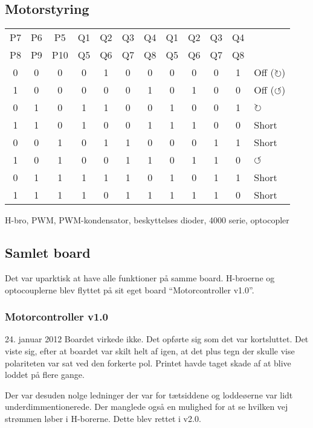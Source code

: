 \documentclass[a4paper,oneside,article,danish,table,draft]{memoir}
\newcommand{\boarddate}[1]{\textcolor{blue!80!black}{#1}}
\begin{document}
\subsection{Motorstyring}
\begin{table}[htbp]
  \centering
  \begin{tabular}{ccc|cccc|ccccl}
      \toprule
     P7&P6&P5 &Q1&Q2&Q3&Q4 &Q1&Q2&Q3&Q4\\
     P8&P9&P10 &Q5&Q6&Q7&Q8 &Q5&Q6&Q7&Q8\\
     \midrule
     0&0&0 &0&1&0&0 &0&0&0&1 & Off ($\circlearrowright$)\\
     1&0&0 &0&0&0&1 &0&1&0&0 & Off ($\circlearrowleft$)\\
     0&1&0 &1&1&0&0 &1&0&0&1 & $\circlearrowright$\\
     1&1&0 &1&0&0&1 &1&1&0&0 & Short\\
     0&0&1 &0&1&1&0 &0&0&1&1 & Short\\
     1&0&1 &0&0&1&1 &0&1&1&0 & $\circlearrowleft$\\
     0&1&1 &1&1&1&0 &1&0&1&1 & Short\\
     1&1&1 &1&0&1&1 &1&1&1&0 & Short\\
    \end{tabular}
  \end{table}

H-bro, PWM, PWM-kondensator, beskyttelses dioder, 4000 serie, optocopler

\subsection{Samlet board}
Det var uparktisk at have alle funktioner på samme board. H-broerne og optocouplerne blev flyttet på sit eget board “Motorcontroller v1.0”.

\subsubsection{Motorcontroller v1.0}
\boarddate{24. januar 2012}
Boardet virkede ikke. Det opførte sig som det var kortsluttet. Det viste sig, efter at boardet var skilt helt af igen, at det plus tegn der skulle vise polariteten var sat ved den forkerte pol. Printet havde taget skade af at blive loddet på flere gange.

Der var desuden nolge ledninger der var for tætsiddene og loddeøerne var lidt underdimmentionerede. Der manglede også en mulighed for at se hvilken vej strømmen løber i H-borerne. Dette blev rettet i v2.0.
\end{document}

